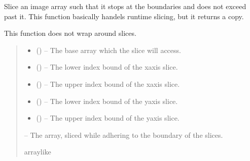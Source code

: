 \documentclass[letterpaper,11pt,english]{sphinxmanual}
\begin{document}
\begin{savenotes}\begin{fulllineitems}
\label{\detokenize{code/opihiexarata.library.image:opihiexarata.library.image.slice_array_boundary}}
\pysigstartsignatures
{}
\pysigstopsignatures
\sphinxAtStartPar
Slice an image array such that it stops at the boundaries and does not
exceed past it. This function basically handels runtime slicing, but it
returns a copy.

\sphinxAtStartPar
This function does not wrap around slices.
\begin{quote}\begin{description}
\begin{itemize}
\item {} 
\sphinxAtStartPar
{} () – The base array which the slice will access.

\item {} 
\sphinxAtStartPar
{} () – The lower index bound of the x\sphinxhyphen{}axis slice.

\item {} 
\sphinxAtStartPar
{} () – The upper index bound of the x\sphinxhyphen{}axis slice.

\item {} 
\sphinxAtStartPar
{} () – The lower index bound of the y\sphinxhyphen{}axis slice.

\item {} 
\sphinxAtStartPar
{} () – The upper index bound of the y\sphinxhyphen{}axis slice.

\end{itemize}

\sphinxAtStartPar
{} – The array, sliced while adhering to the boundary of the slices.

\sphinxAtStartPar
array\sphinxhyphen{}like

\end{description}\end{quote}

\end{fulllineitems}\end{savenotes}
\end{document}
